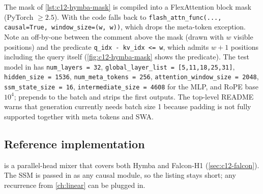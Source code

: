 \begin{implnote}[title={In the code: masks, configs and caveats}]
The mask of \cref{lst:c12-hymba-mask} is compiled into a FlexAttention block mask (PyTorch
$\ge2.5$). With  the code falls back to
\texttt{flash\_attn\_func(..., causal=True, window\_size=(w, w))}, which drops the meta-token
exception. Note an off-by-one between the comment above the mask (drawn with $w$ visible
positions) and the predicate \texttt{q\_idx - kv\_idx <= w}, which admits $w+1$ positions including
the query itself (\cref{fig:c12-hymba-mask} shows the predicate). The test model in
 has \texttt{num\_layers = 32},
\texttt{global\_layer\_list = [5,11,18,25,31]}, \texttt{hidden\_size = 1536},
\texttt{num\_meta\_tokens = 256}, \texttt{attention\_window\_size = 2048}, \texttt{ssm\_state\_size = 16},
\texttt{intermediate\_size = 4608} for the MLP, and RoPE base $10^4$; 
prepends  to the batch and strips the first  outputs.
The top-level README warns that generation currently needs batch size 1 because padding is not
fully supported together with meta tokens and SWA.
\end{implnote}

\subsection{Reference implementation}

 is a parallel-head mixer that covers both Hymba and Falcon-H1
(\cref{sec:c12-falcon}). The SSM is passed in as any causal module, so the listing stays short;
any recurrence from \cref{ch:linear} can be plugged in.

